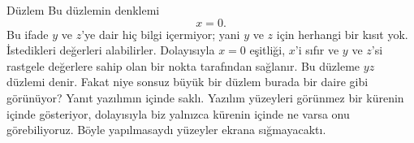 \begin{surferPage}[Düzlem]{Düzlem}
Bu düzlemin denklemi \[x=0.\] Bu ifade $y$ ve $z$'ye dair hiç bilgi içermiyor; yani $y$ ve $z$ için herhangi bir kısıt yok. İstedikleri değerleri alabilirler. Dolayısıyla
$x=0$ eşitliği, $x$'i sıfır ve $y$ ve $z$'si rastgele değerlere sahip olan bir nokta tarafından sağlanır. Bu düzleme $yz$ düzlemi denir.
\newline \newline
Fakat niye sonsuz büyük bir düzlem burada bir daire gibi görünüyor? Yanıt yazılımın içinde saklı.
Yazılım yüzeyleri görünmez bir kürenin içinde gösteriyor, dolayısıyla biz yalnızca kürenin içinde ne varsa onu görebiliyoruz. Böyle yapılmasaydı yüzeyler ekrana sığmayacaktı.
\end{surferPage}
